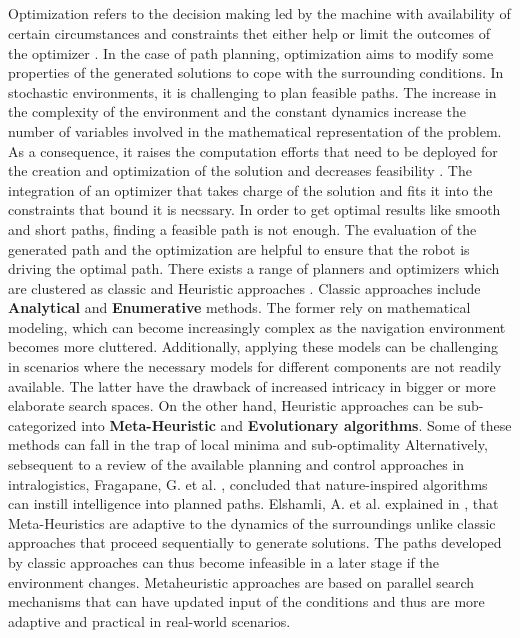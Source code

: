 \subsection{}
Optimization refers to the decision making led by the machine with availability of certain circumstances and constraints
thet either help or limit the outcomes of the optimizer \cite{R37}. In the case of path planning, optimization aims
to modify some properties of the generated solutions to cope with the surrounding conditions.
In stochastic environments, it is challenging to plan feasible paths.
The increase in the complexity of the environment and the constant dynamics increase the number of variables involved 
in the mathematical representation of the problem. As a consequence, it raises the computation efforts that need to be 
deployed for the creation and optimization of the solution and decreases feasibility \cite{R7}.
The integration of an optimizer that takes charge of the solution and fits it into the constraints that bound it is necssary.
In order to get optimal results like smooth and short paths, finding a feasible path is not enough. The evaluation 
of the generated path and the optimization are helpful to ensure that the robot is driving the optimal path.
There exists a range of planners and optimizers which are clustered as classic and Heuristic approaches \cite{R12}.
Classic approaches include \textbf{Analytical} and \textbf{Enumerative} methods. 
The former rely on mathematical modeling, which can become increasingly complex as the navigation environment becomes more 
cluttered. Additionally, applying these models can be challenging in scenarios where the necessary models for different 
components are not readily available. The latter have the drawback of increased intricacy in bigger or more elaborate 
search spaces. On the other hand, Heuristic approaches can be sub-categorized into \textbf{Meta-Heuristic} and \textbf{Evolutionary algorithms}.
Some of these methods can fall in the trap of local minima and sub-optimality \cite{R12}
Alternatively, sebsequent to a review of the available planning and control approaches in intralogistics, Fragapane, G. et al. \cite{R7}, 
concluded that nature-inspired algorithms can instill intelligence into planned paths.
Elshamli, A. et al. explained in \cite{R17}, that Meta-Heuristics are adaptive to the dynamics of the surroundings
unlike classic approaches that proceed sequentially to generate solutions. The paths developed by classic approaches
can thus become infeasible in a later stage if the environment changes. Metaheuristic approaches are based 
on parallel search mechanisms that can have updated input of the conditions and thus are more adaptive and 
practical in real-world scenarios.


